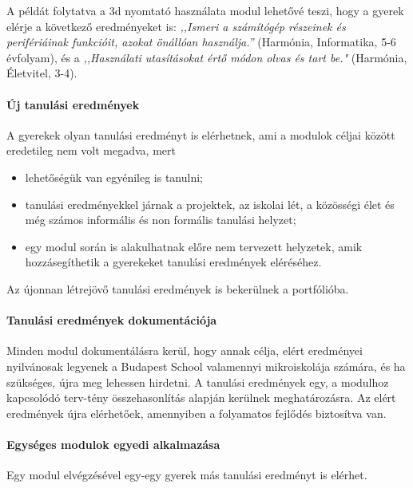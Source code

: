 A példát folytatva a 3d nyomtató használata modul lehetővé teszi, hogy a
gyerek elérje a következő eredményeket is: \emph{,,Ismeri a számítógép
      részeinek és perifériáinak funkcióit, azokat önállóan használja.''}
(Harmónia, Informatika, 5-6 évfolyam), és a \emph{,,Használati utasításokat
      értő módon olvas és tart be."} (Harmónia, Életvitel, 3-4).

\paragraph{Új tanulási eredmények}

A gyerekek olyan tanulási eredményt is elérhetnek, ami a modulok céljai
között eredetileg nem volt megadva, mert

\begin{itemize}
      \item lehetőségük van egyénileg is tanulni;

      \item tanulási eredményekkel járnak a projektek, az iskolai lét, a
            közösségi
            élet és még számos informális és non formális tanulási helyzet;

      \item egy modul során is alakulhatnak előre nem tervezett helyzetek, amik
            hozzásegíthetik a gyerekeket tanulási eredmények eléréséhez.
\end{itemize}

Az újonnan létrejövő tanulási eredmények is bekerülnek a portfólióba.

\paragraph{Tanulási eredmények dokumentációja}

Minden modul dokumentálásra kerül, hogy annak célja, elért eredményei
nyilvánosak legyenek a Budapest School valamennyi mikroiskolája számára,
és ha szükséges, újra meg lehessen hirdetni. A tanulási eredmények egy,
a modulhoz kapcsolódó terv-tény összehasonlítás alapján kerülnek
meghatározásra. Az elért eredmények újra elérhetőek, amennyiben a
folyamatos fejlődés biztosítva van.

\paragraph{Egységes modulok egyedi alkalmazása}

Egy modul elvégzésével egy-egy gyerek más tanulási eredményt is elérhet.

